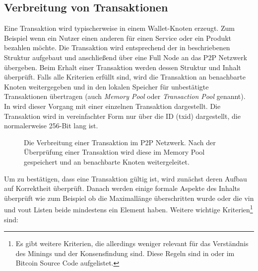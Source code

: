 \documentclass[ngerman,runningheads,a4paper]{llncs}[2018/03/10]
\begin{document}
\subsection{Verbreitung von Transaktionen}\label{sec:transaktionsverbreitung}

Eine Transaktion wird typischerweise in einem Wallet-Knoten erzeugt. Zum Beispiel wenn ein Nutzer einen anderen für einen Service oder ein Produkt bezahlen möchte. Die Transaktion wird entsprechend der in  beschriebenen Struktur aufgebaut und anschließend über eine Full Node an das P2P Netzwerk übergeben. Beim Erhalt einer Transaktion werden dessen Struktur und Inhalt überprüft. Falls alle Kriterien erfüllt sind, wird die Transaktion an benachbarte Knoten weitergegeben und in den lokalen Speicher für unbestätigte Transaktionen übertragen (auch \textit{Memory Pool} oder \textit{Transaction Pool} genannt). In  wird dieser Vorgang mit einer einzelnen Transaktion dargestellt. Die Transaktion wird in vereinfachter Form nur über die ID (txid) dargestellt, die normalerweise 256-Bit lang ist.

\begin{figure}
  \centering
  \caption{Die Verbreitung einer Transaktion im P2P Netzwerk. Nach der Überprüfung einer Transaktion wird diese im Memory Pool gespeichert und an benachbarte Knoten weitergeleitet.}
  \label{fig:transactionPropagation}
\end{figure}

Um zu bestätigen, dass eine Transaktion gültig ist, wird zunächst deren Aufbau auf Korrektheit überprüft. Danach werden einige formale Aspekte des Inhalts überprüft wie zum Beispiel ob die Maximallänge überschritten wurde oder die vin und vout Listen beide mindestens ein Element haben. Weitere wichtige Kriterien\footnote{Es gibt weitere Kriterien, die allerdings weniger relevant für das Verständnis des Minings und der Konsensfindung sind. Diese Regeln sind in \citep{bitcoinbook} oder im Bitcoin Source Code \citep{bitcoincore} aufgelistet.} sind:
\end{document}
